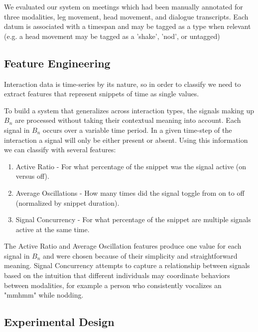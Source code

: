\documentclass[conference]{IEEEtran}
\newcommand{\meta}[1]{{\textcolor[rgb]{0.1,0.7,0.2}{[JSS: {\it #1}]}}}
\begin{document}
We evaluated our system on meetings which had been manually annotated for three modalities, leg movement, head movement, and dialogue transcripts. Each datum is associated with a timespan and may be tagged as a type when relevant (e.g. a head movement may be tagged as a 'shake', 'nod', or untagged)

\subsection{Feature Engineering}\label{feature_engineering}
Interaction data is time-series by its nature, so in order to classify we need to extract features that represent snippets of time as single values.  

To build a system that generalizes across interaction types, the signals making up $B_n$ are processed without taking their contextual meaning into account. Each signal in $B_n$ occurs over a variable time period. In a given time-step of the interaction a signal will only be either present or absent. Using this information we can classify with several features:

\begin{enumerate}
    \item Active Ratio - For what percentage of the snippet was the signal active (on versus off).
    \item Average Oscillations - How many times did the signal toggle from on to off (normalized by snippet duration). 
    \item Signal Concurrency - For what percentage of the snippet are multiple signals active at the same time. 
\end{enumerate}

The Active Ratio and Average Oscillation features produce one value for each signal in $B_n$ and were chosen because of their simplicity and straightforward meaning. Signal Concurrency attempts to capture a relationship between signals based on the intuition that different individuals may coordinate behaviors between modalities, for example a person who consistently vocalizes an "mmhmm" while nodding. 


\subsection{Experimental Design}
\end{document}
